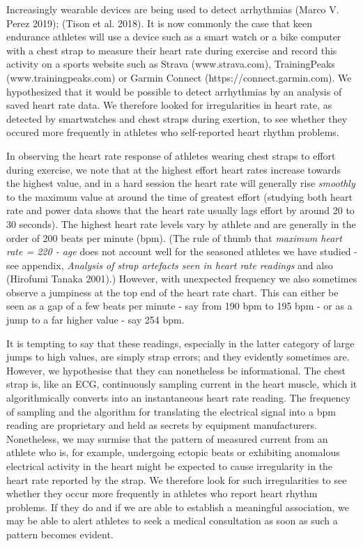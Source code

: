 \documentclass[
  letterpaper,
  DIV=11,
  numbers=noendperiod]{scrartcl}
\begin{document}
Increasingly wearable devices are being used to detect arrhythmias
(Marco V. Perez 2019); (Tison et al. 2018). It is now commonly the case
that keen endurance athletes will use a device such as a smart watch or
a bike computer with a chest strap to measure their heart rate during
exercise and record this activity on a sports website such as Strava
(www.strava.com), TrainingPeaks (www.trainingpeaks.com) or Garmin
Connect (https://connect.garmin.com). We hypothesized that it would be
possible to detect arrhythmias by an analysis of saved heart rate data.
We therefore looked for irregularities in heart rate, as detected by
smartwatches and chest straps during exertion, to see whether they
occured more frequently in athletes who self-reported heart rhythm
problems.

In observing the heart rate response of athletes wearing chest straps to
effort during exercise, we note that at the highest effort heart rates
increase towards the highest value, and in a hard session the heart rate
will generally rise \emph{smoothly} to the maximum value at around the
time of greatest effort (studying both heart rate and power data shows
that the heart rate usually lags effort by around 20 to 30 seconds). The
highest heart rate levels vary by athlete and are generally in the order
of 200 beats per minute (bpm). (The rule of thumb that \emph{maximum
heart rate = 220 - age} does not account well for the seasoned athletes
we have studied - see appendix, \emph{Analysis of strap artefacts seen
in heart rate readings} and also (Hirofumi Tanaka 2001).) However, with
unexpected frequency we also sometimes observe a jumpiness at the top
end of the heart rate chart. This can either be seen as a gap of a few
beats per minute - say from 190 bpm to 195 bpm - or as a jump to a far
higher value - say 254 bpm.

It is tempting to say that these readings, especially in the latter
category of large jumps to high values, are simply strap errors; and
they evidently sometimes are. However, we hypothesise that they can
nonetheless be informational. The chest strap is, like an ECG,
continuously sampling current in the heart muscle, which it
algorithmically converts into an instantaneous heart rate reading. The
frequency of sampling and the algorithm for translating the electrical
signal into a bpm reading are proprietary and held as secrets by
equipment manufacturers. Nonetheless, we may surmise that the pattern of
measured current from an athlete who is, for example, undergoing ectopic
beats or exhibiting anomalous electrical activity in the heart might be
expected to cause irregularity in the heart rate reported by the strap.
We therefore look for such irregularities to see whether they occur more
frequently in athletes who report heart rhythm problems. If they do and
if we are able to establish a meaningful association, we may be able to
alert athletes to seek a medical consultation as soon as such a pattern
becomes evident.
\end{document}
